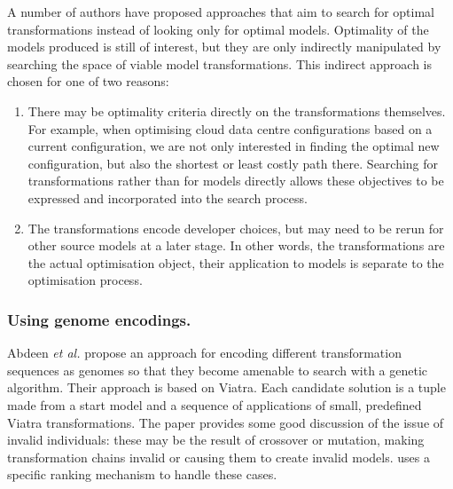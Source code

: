 		A number of authors have proposed approaches that aim to search for optimal transformations instead of looking only for optimal models. Optimality of the
		models produced is still of interest, but they are only indirectly manipulated by searching the space of viable model transformations. This indirect approach
		is chosen for one of two reasons: 
		\begin{enumerate}
			\item There may be optimality criteria directly on the transformations themselves. For example, when optimising cloud data centre configurations based on a
			      current configuration, we are not only interested in finding the optimal new configuration, but also the shortest or least costly path there.
						Searching for transformations rather than for models directly allows these objectives to be expressed and incorporated into the search process.
		  \item The transformations encode developer choices, but may need to be rerun for other source models at a later stage. In other words, the transformations
			      are the actual optimisation object, their application to models is separate to the optimisation process.
		\end{enumerate}
			
		\subsubsection{Using genome encodings.}
	
			
			Abdeen \emph{et al.} \cite{Abdeen+14} propose an approach for encoding different transformation sequences as genomes so that they become amenable to search
			with a genetic algorithm. Their approach is based on Viatra. Each candidate solution is a tuple made from a start model and a sequence of applications of
			small, predefined Viatra transformations. The paper provides some good discussion of the issue of invalid individuals: these may be the result of crossover
			or mutation, making transformation chains invalid or causing them to create invalid models. \cite{Abdeen+14} uses a specific ranking mechanism to handle
			these cases.
			
